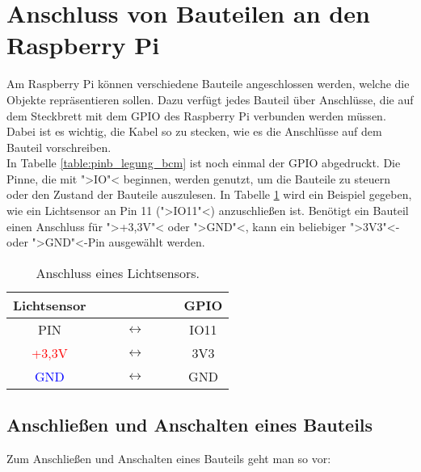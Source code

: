 \documentclass[11pt, a4paper]{article}
\begin{document}
\section*{Anschluss von Bauteilen an den Raspberry Pi}

Am Raspberry Pi können verschiedene Bauteile angeschlossen werden, welche die Objekte repräsentieren sollen. Dazu verfügt jedes Bauteil über Anschlüsse, die auf dem Steckbrett mit dem GPIO des Raspberry Pi verbunden werden müssen. Dabei ist es wichtig, die Kabel so zu stecken, wie es die Anschlüsse auf dem Bauteil vorschreiben.\\

In Tabelle \ref{table:pinb_legung_bcm} ist noch einmal der GPIO abgedruckt. Die Pinne, die mit ">IO"< beginnen, werden genutzt, um die Bauteile zu steuern oder den Zustand der Bauteile auszulesen. In Tabelle \ref{table:anschluss_lichtsensor} wird ein Beispiel gegeben, wie ein Lichtsensor an Pin 11 (">IO11"<) anzuschließen ist. Benötigt ein Bauteil einen Anschluss für ">+3,3V"< oder ">GND"<, kann ein beliebiger ">3V3"<- oder ">GND"<-Pin ausgewählt werden.

\begin{table}[htbp]
  \centering
  \begin{tabular}{@{} ccc @{}}
    \toprule
    Lichtsensor &  & GPIO \\ 
    \midrule
    PIN & $\qquad\longleftrightarrow\qquad$ & IO11 \\ 
    \textcolor{red}{+3,3V} & $\longleftrightarrow$ & 3V3 \\ 
    \textcolor{blue}{GND} & $\longleftrightarrow$ & GND \\ 
    \bottomrule
  \end{tabular}
  \caption{Anschluss eines Lichtsensors.}
  \label{table:anschluss_lichtsensor}
\end{table}

\subsection*{Anschließen und Anschalten eines Bauteils}
Zum Anschließen und Anschalten eines Bauteils geht man so vor:
\end{document}
